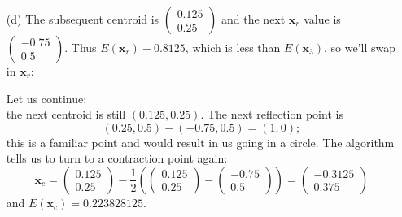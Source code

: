 \documentclass[11pt,a4paper]{scrartcl}
\begin{document}
\begin{enumerate}
\begin{enumerate}

        \item[(d)] The subsequent centroid is $      \begin{pmatrix}
        0.125\\0.25
        \end{pmatrix}$ and the next $\mathbf{x}_r$ value is $      \begin{pmatrix}
            -0.75\\0.5
        \end{pmatrix}$.
        Thus $E(\mathbf{x}_r) - 0.8125$, which is less than $E(\mathbf{x}_3)$, so we'll swap in $\mathbf{x}_r$:


Let us continue:\\
the next centroid is still $(0.125,0.25)$. The next reflection point is 
\[
(0.25,0.5) - (-0.75, 0.5) = (1,0);
\]
this is a familiar point and would result in us going in a circle. The algorithm tells us to turn to a contraction point again:
\[
\mathbf{x}_c = \begin{pmatrix}
        0.125\\0.25
        \end{pmatrix}
     -
     \frac12 \left(
     \begin{pmatrix}
        0.125\\0.25
        \end{pmatrix}
        - \begin{pmatrix}
        -0.75\\0.5
        \end{pmatrix}
     \right)
     = 
     \begin{pmatrix}
         -0.3125\\ 0.375
     \end{pmatrix}
\]
and $E(\mathbf{x}_c) = 0.223828125$.


\end{enumerate}
\end{enumerate}
\end{document}
